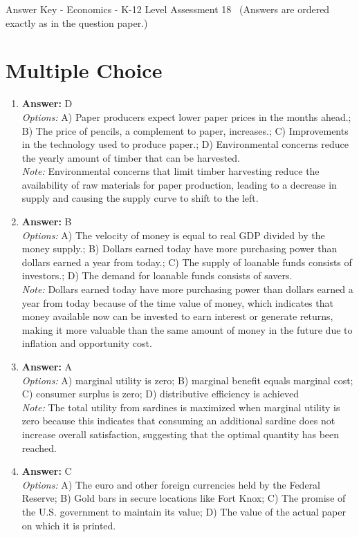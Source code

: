 \documentclass[12pt]{article}
\begin{document}
\begin{center}
Answer Key - Economics - K-12 Level Assessment 18 \
\small (Answers are ordered exactly as in the question paper.)
\end{center}

\section*{Multiple Choice}
\begin{enumerate}[label=\arabic*.]
\item \textbf{Answer:} D
\\ \textit{Options:} A) Paper producers expect lower paper prices in the months ahead.; B) The price of pencils, a complement to paper, increases.; C) Improvements in the technology used to produce paper.; D) Environmental concerns reduce the yearly amount of timber that can be harvested.
\\ \textit{Note:} Environmental concerns that limit timber harvesting reduce the availability of raw materials for paper production, leading to a decrease in supply and causing the supply curve to shift to the left.
\item \textbf{Answer:} B
\\ \textit{Options:} A) The velocity of money is equal to real GDP divided by the money supply.; B) Dollars earned today have more purchasing power than dollars earned a year from today.; C) The supply of loanable funds consists of investors.; D) The demand for loanable funds consists of savers.
\\ \textit{Note:} Dollars earned today have more purchasing power than dollars earned a year from today because of the time value of money, which indicates that money available now can be invested to earn interest or generate returns, making it more valuable than the same amount of money in the future due to inflation and opportunity cost.
\item \textbf{Answer:} A
\\ \textit{Options:} A) marginal utility is zero; B) marginal benefit equals marginal cost; C) consumer surplus is zero; D) distributive efficiency is achieved
\\ \textit{Note:} The total utility from sardines is maximized when marginal utility is zero because this indicates that consuming an additional sardine does not increase overall satisfaction, suggesting that the optimal quantity has been reached.
\item \textbf{Answer:} C
\\ \textit{Options:} A) The euro and other foreign currencies held by the Federal Reserve; B) Gold bars in secure locations like Fort Knox; C) The promise of the U.S. government to maintain its value; D) The value of the actual paper on which it is printed.

\end{enumerate}
\end{document}
